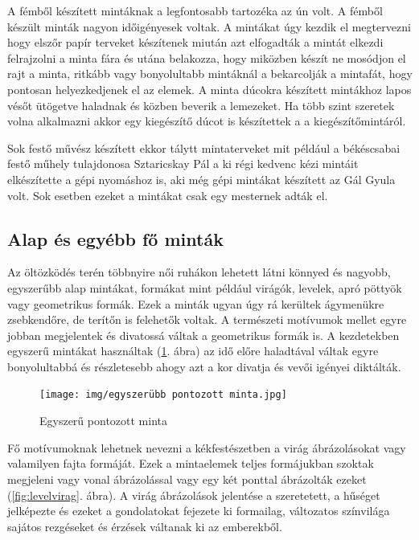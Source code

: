 A fémből készített mintáknak a legfontosabb tartozéka az ún volt. A fémből készült minták nagyon időigényesek voltak. A mintákat úgy kezdik el megtervezni hogy elszőr papír terveket készítenek miután azt elfogadták a mintát elkezdi felrajzolni a minta fára és utána belakozza, hogy miközben készít ne mosódjon el rajt a minta, ritkább vagy bonyolultabb mintáknál a bekarcolják a mintafát, hogy pontosan helyezkedjenek el az elemek.
A minta dúcokra készített mintákhoz lapos vésőt ütögetve haladnak és közben beverik a lemezeket. Ha több szint szeretek volna alkalmazni akkor egy kiegészítő dúcot is készítettek a a kiegészítőmintáról.

Sok festő művész készített ekkor tálytt mintaterveket mit például a békéscsabai festő műhely tulajdonosa Sztaricskay Pál a ki régi kedvenc kézi mintáit elkészítette a gépi nyomáshoz is, aki még  gépi mintákat készített az Gál Gyula volt. Sok esetben ezeket a mintákat csak egy mesternek adták el.

\subsection{Alap és egyébb fő minták}
Az öltözködés terén többnyire női ruhákon lehetett látni könnyed és nagyobb, egyszerűbb alap mintákat, formákat mint például virágók, levelek, apró pöttyök vagy geometrikus formák.
Ezek a minták ugyan úgy rá kerültek ágymenükre zsebkendőre, de terítőn is felehetők voltak.
A természeti motívumok mellet egyre jobban megjelentek és divatossá váltak a geometrikus formák is.
A kezdetekben egyszerű mintákat használtak (\ref{fig:egyszeruminta}. ábra) az idő előre haladtával váltak egyre bonyolultabbá és részletesebb ahogy azt a kor divatja és vevői igényei diktálták.

\begin{figure}[h!]
	\centering
	\texttt{[image: img/egyszerübb pontozott minta.jpg]}
	\caption{Egyszerű pontozott minta}
	\label{fig:egyszeruminta}
\end{figure}

Fő motívumoknak lehetnek nevezni a kékfestészetben a virág ábrázolásokat vagy valamilyen fajta formáját.  
Ezek a mintaelemek teljes formájukban szoktak megjeleni vagy vonal ábrázolással vagy egy két ponttal ábrázolták ezeket (\ref{fig:levelvirag}. ábra).
A virág ábrázolások jelentése a szeretetett, a hűséget jelképezte és  ezeket a gondolatokat fejezete ki formailag, változatos színvilága sajátos rezgéseket és érzések váltanak ki az emberekből.


